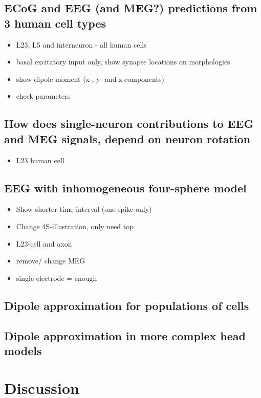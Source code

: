 \documentclass[preprint,10pt,authoryear]{elsarticle}
\newcommand{\sntxt}[1]{{\color{NavyBlue}#1}}
\begin{document}
\subsection{ECoG and EEG (and MEG?) predictions from 3 human cell types}
\sntxt{
\begin{itemize}
	\item L23, L5 and interneuron - all human cells
	\item basal excitatory input only, show synapse locations on morphologies
	\item show dipole moment (x-, y- and z-components)
	\item check parameters
	
\end{itemize}
	}
\subsection{How does single-neuron contributions to EEG and MEG signals, depend on neuron rotation}
\sntxt{
\begin{itemize}
	\item L23 human cell
\end{itemize}
	}

\subsection{EEG with inhomogeneous four-sphere model}
\sntxt{
\begin{itemize}
	\item Show shorter time interval (one spike only)
	\item Change 4S-illustration, only need top
	\item L23-cell and axon
	\item remove/ change MEG
	\item single electrode = enough
\end{itemize}
	}

\subsection{Dipole approximation for populations of cells}

\subsection{Dipole approximation in more complex head models}

\section{Discussion}\label{sec:discussion}



\end{document}
